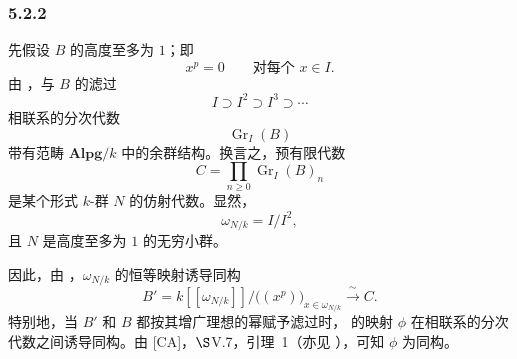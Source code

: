 
\subsubsection*{5.2.2}
\label{sga3:VIIB:5.2.2}

先假设 \(B\) 的高度至多为 \(1\)；即
\[
  x^p=0
  \qquad\text{对每个 }x\in I.
\]
由 ，与 \(B\) 的滤过
\[
  I\supset I^2\supset I^3\supset\cdots
\]
相联系的分次代数
\[
  \operatorname{Gr}_I(B)
\]
带有范畴 \(\mathbf{Alpg}/k\) 中的余群结构。换言之，预有限代数
\[
  C=\prod_{n\geq0}\operatorname{Gr}_I(B)_n
\]
是某个形式 \(k\)-群 \(N\) 的仿射代数。显然，
\[
  \omega_{N/k}=I/I^2,
\]
且 \(N\) 是高度至多为 \(1\) 的无穷小群。

因此，由 ，\(\omega_{N/k}\) 的恒等映射诱导同构
\[
  B'
  =
  k[[\omega_{N/k}]]
  \big/
  \bigl((x^p)\bigr)_{x\in\omega_{N/k}}
  \xrightarrow{\ \sim\ }
  C.
\]
特别地，当 \(B'\) 和 \(B\) 都按其增广理想的幂赋予滤过时， 的映射 \(\phi\) 在相联系的分次代数之间诱导同构。由 \textup{[CA]}，\(\S\)V.7，引理~1\textup{（亦见 ）}，可知 \(\phi\) 为同构。
